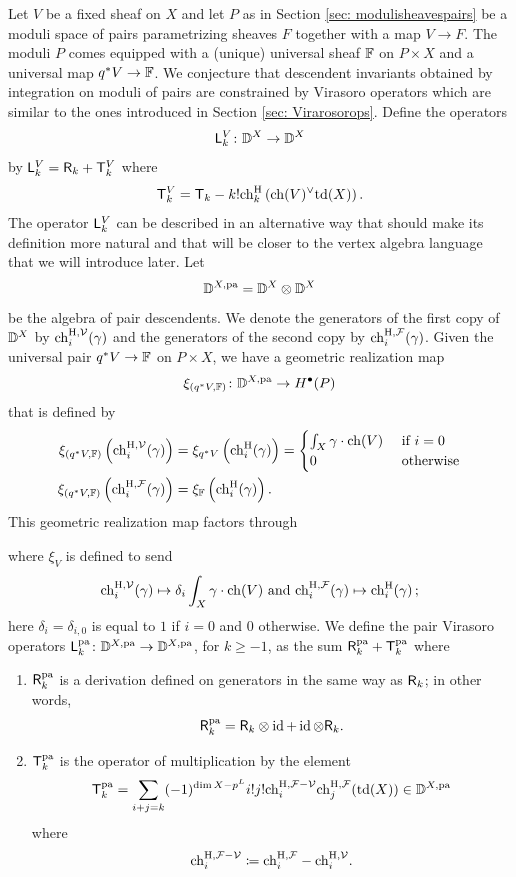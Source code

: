 \documentclass[a4paper, 12pt]{amsart}
\begin{document}
Let $V$ be a fixed sheaf on $X$ and let $P$ as in  Section \ref{sec: modulisheavespairs} be a moduli space of pairs parametrizing sheaves $F$ together with a map $V\to F$. The moduli $P$ comes equipped with a (unique) universal sheaf ${\mathbb{F}}$ on $P\times X$ and a universal map $q^\ast V\to {\mathbb{F}}$. We conjecture that descendent invariants obtained by integration on moduli of pairs are constrained by Virasoro operators which are similar to the ones introduced in Section \ref{sec: Virarosorops}. Define the operators 
\[{\mathsf{L}}_k^V\colon {\mathbb{D}}^X\to {\mathbb{D}}^X\]
by ${\mathsf{L}}_k^V=\mathsf{R}_k+{\mathsf{T}}_k^V$ where
\[{\mathsf{T}}_k^V={\mathsf{T}}_k-k!\mathrm{ch}^{\mathrm{H}}_k\left(\mathrm{ch}(V)^\vee\mathrm{td}(X)\right).\]
The operator ${\mathsf{L}}_k^V$ can be described in an alternative way that should make its definition more natural and that will be closer to the vertex algebra language that we will introduce later. Let 
\[{\mathbb{D}}^{X, \mathop{\rm pa}\nolimits}={\mathbb{D}}^X\otimes{\mathbb{D}}^X\]
be the algebra of pair descendents. We denote the generators of the first copy of ${\mathbb{D}}^X$ by  $\mathrm{ch}_i^{\mathrm{H}, {\mathcal V}}(\gamma)$ and the generators of the second copy by  $\mathrm{ch}_i^{\mathrm{H}, {\mathcal F}}(\gamma)$. Given the universal pair $q^\ast V\to {\mathbb{F}}$ on $P\times X$, we have a geometric realization map
\[\xi_{(q^\ast V,{\mathbb{F}})}\colon {\mathbb{D}}^{X, \mathop{\rm pa}\nolimits}\to H^\bullet(P)\]
that is defined by
\begin{align*}\xi_{(q^\ast V, {\mathbb{F}})}\left(\mathrm{ch}_i^{\mathrm{H}, {\mathcal V}}(\gamma)\right)&=\xi_{q^\ast V}\left(\mathrm{ch}^{\mathrm{H}}_i(\gamma)\right)=\begin{cases}\int_X \gamma\cdot \mathrm{ch}(V)&\textup{ if }i=0\\
0 & \textup{ otherwise}\end{cases}\\
\xi_{( q^\ast V, {\mathbb{F}})}\left(\mathrm{ch}_i^{\mathrm{H}, {\mathcal F}}(\gamma)\right)&=\xi_{{\mathbb{F}}}\left(\mathrm{ch}^{\mathrm{H}}_i(\gamma)\right).
\end{align*}
This geometric realization map factors through
\begin{center}
\end{center}
where $\xi_{V}$ is defined to send 
\[\mathrm{ch}_i^{\mathrm{H}, {\mathcal V}}(\gamma)\mapsto \delta_i \int_X \gamma\cdot \mathrm{ch}(V)\textup{ and }\mathrm{ch}_i^{\mathrm{H}, {\mathcal F}}(\gamma)\mapsto \mathrm{ch}_i^{\mathrm{H}}(\gamma)\,;\]
here $\delta_i=\delta_{i,0}$ is equal to $1$ if $i=0$ and $0$ otherwise.
We define the pair Virasoro operators ${\mathsf{L}}_k^{\mathop{\rm pa}\nolimits}\colon {\mathbb{D}}^{X, \mathop{\rm pa}\nolimits}\to {\mathbb{D}}^{X, \mathop{\rm pa}\nolimits}$, for $k\geq -1$, as the sum $\mathsf{R}_k^{\mathop{\rm pa}\nolimits}+{\mathsf{T}}_k^{\mathop{\rm pa}\nolimits}$ where
\begin{enumerate}
\item $\mathsf{R}_k^{\mathop{\rm pa}\nolimits}$ is a derivation defined on generators in the same way as $\mathsf{R}_k$; in other words,
\[\mathsf{R}_k^{\mathop{\rm pa}\nolimits}=\mathsf{R}_k\otimes \operatorname{id}+\operatorname{id}\otimes \mathsf{R}_k.\]
\item ${\mathsf{T}}_k^{\mathop{\rm pa}\nolimits}$ is the operator of multiplication by the element
\[{\mathsf{T}}_k^{\mathop{\rm pa}\nolimits}=\sum_{i+j=k} (-1)^{\dim X- p^L}i!j!\mathrm{ch}_i^{\mathrm{H}, {\mathcal F}-{\mathcal V}}\mathrm{ch}_j^{\mathrm{H}, {\mathcal F}}(\mathrm{td}(X))\in {\mathbb{D}}^{X, \mathop{\rm pa}\nolimits}\]
where
\[\mathrm{ch}_i^{\mathrm{H}, {\mathcal F}-{\mathcal V}}\coloneqq \mathrm{ch}_i^{\mathrm{H}, {\mathcal F}}-\mathrm{ch}_i^{\mathrm{H}, {\mathcal V}}.\]
\end{enumerate}
\end{document}
